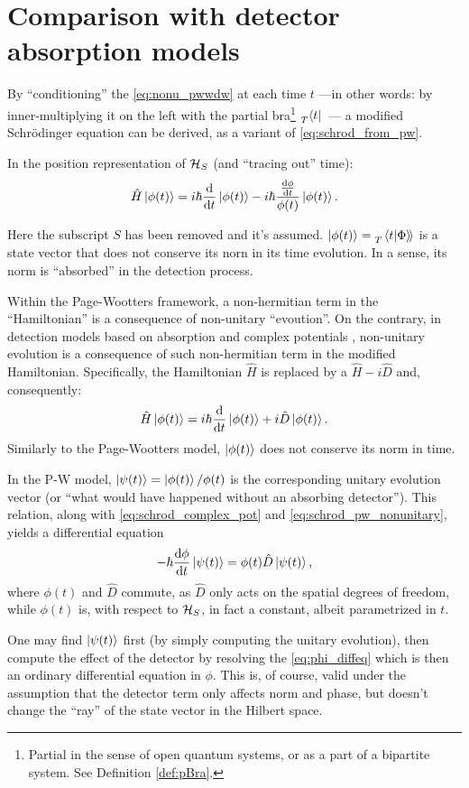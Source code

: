 \section{Comparison with detector absorption models}

By ``conditioning'' the \eqref{eq:nonu_pwwdw} at each time $t$
---in other words: by inner-multiplying it on the left with the partial bra\footnote{
  Partial in the sense of open quantum systems, or as a part of a bipartite system.
  See Definition \ref{def:pBra}.
}
$\prescript{}{T}{\bra{t}}$~---
a modified Schr{\"o}dinger equation
can be derived,
as a variant of \eqref{eq:schrod_from_pw}.

In the position representation of $\mathcal{H}_S$ (and ``tracing out'' time):
\begin{equation}\label{eq:schrod_pw_nonunitary}
  \hat{H} \ket{\phi(t)} = i\hbar\dv{t}\ket{\phi(t)} -i\hbar\frac{\dv{\phi}{t}}{\phi(t)}\ket{\phi(t)} \text{.}
\end{equation}

Here the subscript $S$ has been removed and it's assumed.
$\ket{\phi(t)} = \prescript{}{T}{\left.\left\langle t \middle| \Phi \right\rangle\!\right\rangle}$
is a state vector that does not conserve its norn in its time evolution.
In a sense, its norm is ``absorbed'' in the detection process.

Within the Page-Wootters framework, a non-hermitian term in the ``Hamiltonian''
is a consequence of non-unitary ``evoution''.
On the contrary, in detection models based on absorption and complex potentials
\parencite{RuschhauptAbsorption}, non-unitary evolution is a consequence
of such non-hermitian term in the modified Hamiltonian.
Specifically, the Hamiltonian $\hat{H}$ is replaced by a $\hat{H} - i\hat{D}$
and, consequently:
\begin{equation}\label{eq:schrod_complex_pot}
  \hat{H} \ket{\phi(t)} = i\hbar\dv{t}\ket{\phi(t)} +i\hat{D}\ket{\phi(t)} \text{.}
\end{equation}
Similarly to the Page-Wootters model, $\ket{\phi(t)}$ does not conserve its norm in time.

In the P-W model, $\ket{\psi(t)} = \ket{\phi(t)}/\phi(t)$
is the corresponding unitary evolution vector
(or ``what would have happened without an absorbing detector'').
This relation, along with \eqref{eq:schrod_complex_pot} and \eqref{eq:schrod_pw_nonunitary},
yields a differential equation
\begin{equation}\label{eq:phi_diffeq}
  -\hbar\dv{\phi}{t}\ket{\psi(t)} = \phi(t) \hat{D} \ket{\psi(t)} \text{,}
\end{equation}
where $\phi(t)$ and $\hat{D}$ commute, as $\hat{D}$ only acts on the spatial degrees of freedom,
while $\phi(t)$ is, with respect to $\mathcal{H}_S$, in fact a constant, albeit parametrized in $t$.

One may find $\ket{\psi(t)}$ first (by simply computing the unitary evolution),
then compute the effect of the detector by resolving the \eqref{eq:phi_diffeq}
which is then an ordinary differential equation in $\phi$. This is, of course, valid
under the assumption that the detector term only affects norm and phase,
but doesn't change the ``ray'' of the state vector in the Hilbert space. 
